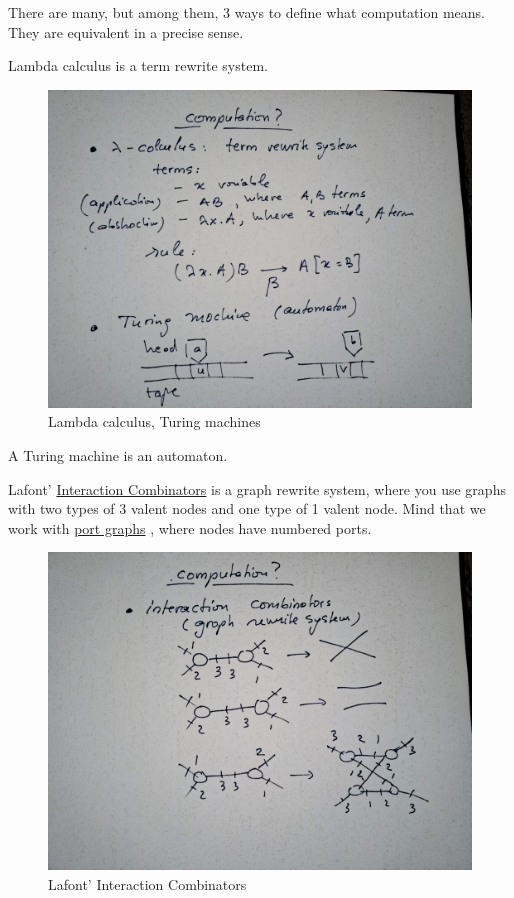 \documentclass[]{article}
\begin{document}
There are many, but among them, 3 ways to define what computation means.
They are equivalent in a precise sense.

Lambda calculus is a term rewrite system.

\begin{figure}[h!]
\centering
\includegraphics[width=0.75\linewidth]{img/2832.jpg}
\caption{Lambda calculus, Turing machines}
\end{figure}

A Turing machine is an automaton.

Lafont'
\href{https://pdfs.semanticscholar.org/6cfe/09aa6e5da6ce98077b7a048cb1badd78cc76.pdf}{Interaction
Combinators}  \cite{lafont} is a graph rewrite system, where you use graphs with two
types of 3 valent nodes and one type of 1 valent node. Mind that we work
with
\href{http://citeseerx.ist.psu.edu/viewdoc/download?doi=10.1.1.18.5446\&rep=rep1\&type=pdf}{port
graphs} \cite{bawden}, where nodes have numbered ports.

\begin{figure}[h!]
\centering
\includegraphics[width=0.75\linewidth]{img/2846.jpg}
\caption{Lafont' Interaction Combinators}
\label{Lafont-Interaction-Combinators}
\end{figure}
\end{document}
